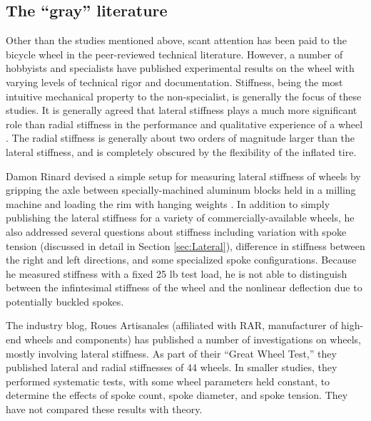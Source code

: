 \documentclass[../thesis.tex]{subfiles}
\begin{document}

\subsection{The ``gray'' literature}

Other than the studies mentioned above, scant attention has been paid to the bicycle wheel in the peer-reviewed technical literature. However, a number of hobbyists and specialists have published experimental results on the wheel with varying levels of technical rigor and documentation. Stiffness, being the most intuitive mechanical property to the non-specialist, is generally the focus of these studies. It is generally agreed that lateral stiffness plays a much more significant role than radial stiffness in the performance and qualitative experience of a wheel \cite{SlowTwitch}. The radial stiffness is generally about two orders of magnitude larger than the lateral stiffness, and is completely obscured by the flexibility of the inflated tire.

Damon Rinard devised a simple setup for measuring lateral stiffness of wheels by gripping the axle between specially-machined aluminum blocks held in a milling machine and loading the rim with hanging weights \cite{Rinard}. In addition to simply publishing the lateral stiffness for a variety of commercially-available wheels, he also addressed several questions about stiffness including variation with spoke tension (discussed in detail in Section \ref{sec:Lateral}), difference in stiffness between the right and left directions, and some specialized spoke configurations. Because he measured stiffness with a fixed 25 lb test load, he is not able to distinguish between the infintesimal stiffness of the wheel and the nonlinear deflection due to potentially buckled spokes.

The industry blog, Roues Artisanales \cite{RouesArtisanales} (affiliated with RAR, manufacturer of high-end wheels and components) has published a number of investigations on wheels, mostly involving lateral stiffness. As part of their ``Great Wheel Test,'' they published lateral and radial stiffnesses of 44 wheels. In smaller studies, they performed systematic tests, with some wheel parameters held constant, to determine the effects of spoke count, spoke diameter, and spoke tension. They have not compared these results with theory.
\end{document}
